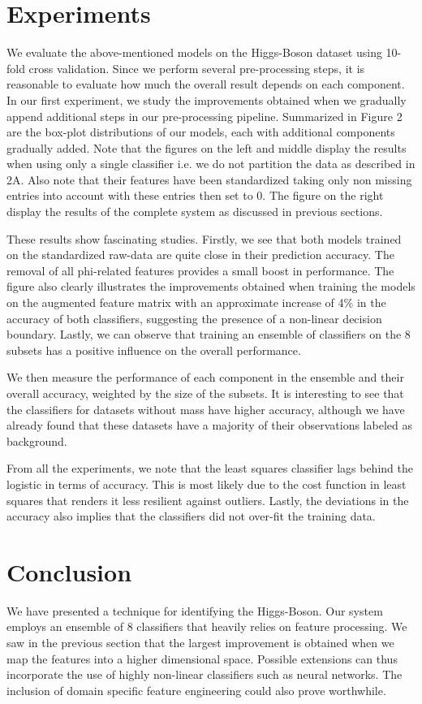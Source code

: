 \documentclass[10pt,conference,compsocconf]{IEEEtran}
\begin{document}
\section{Experiments}

We evaluate the above-mentioned models on the Higgs-Boson dataset using 10-fold cross validation. Since we perform several pre-processing steps, it is reasonable to evaluate how much the overall result depends on each component. In our first experiment, we study the improvements obtained when we gradually append additional steps in our pre-processing pipeline. Summarized in Figure 2 are the box-plot distributions of our models, each with additional components gradually added. Note that the figures on the left and middle display the results when using only a single classifier i.e. we do not partition the data as described in 2A. Also note that their features have been standardized taking only non missing entries into account with these entries then set to 0. The figure on the right display the results of the complete system as discussed in previous sections.

These results show fascinating studies. Firstly, we see that both models trained on the standardized raw-data are quite close in their prediction accuracy. The removal of all phi-related features provides a small boost in performance. The figure also clearly illustrates the improvements obtained when training the models on the augmented feature matrix with an approximate increase of 4\% in the accuracy of both classifiers, suggesting the presence of a non-linear decision boundary. Lastly, we can observe that training an ensemble of classifiers on the 8 subsets has a positive influence on the overall performance. 

We then measure the performance of each component in the ensemble and their overall accuracy, weighted by the size of the subsets. It is interesting to see that the classifiers for datasets without mass have higher accuracy, although we have already found that these datasets have a majority of their observations labeled as background. 

From all the experiments, we note that the least squares classifier lags behind the logistic in terms of accuracy. This is most likely due to the cost function in least squares that renders it less resilient against outliers. Lastly, the deviations in the accuracy also implies that the classifiers did not over-fit the training data.

\section{Conclusion}

We have presented a technique for identifying the Higgs-Boson. Our system employs an ensemble of 8 classifiers that heavily relies on feature processing. We saw in the previous section that the largest improvement is obtained when we map the features into a higher dimensional space. Possible extensions can thus incorporate the use of highly non-linear classifiers such as neural networks. The inclusion of domain specific feature engineering could also prove worthwhile.



\end{document}
